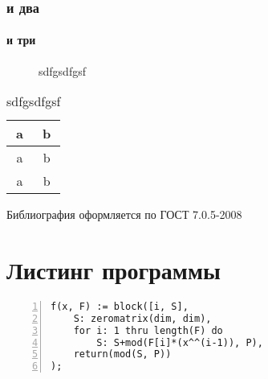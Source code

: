 \documentclass[14pt,Magister]{diplomwork}
\newcommand{\alert}[1]{{\color{red}#1}}
\begin{document}
\subsection{и два}
\subsubsection{и три}
\begin{figure}[H]
	\caption{sdfgsdfgsf}
	\label{fig:wqewe}
\end{figure}

\begin{table}[H]
	\caption{sdfgsdfgsf}
	\label{tbl:wqewe}
	\begin{tabular}{|c|c|}
		\hline
		a & b \\
		\hline
		a & b \\
		\hline
		a & b \\
		\hline
	\end{tabular}
\end{table}





\begin{thebibliography}{99}
 \alert{Библиография оформляется по ГОСТ 7.0.5-2008} 
\end{thebibliography}

\APPENDIX
\chapter{Листинг программы}
\linespread{1}

\begin{Verbatim}[numbers=left,firstnumber=last,fontsize=\small]
f(x, F) := block([i, S], 
    S: zeromatrix(dim, dim), 
    for i: 1 thru length(F) do
        S: S+mod(F[i]*(x^^(i-1)), P), 
    return(mod(S, P))
);
\end{Verbatim}  
\end{document}

